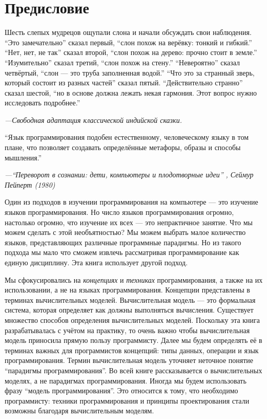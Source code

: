 \chapter*{Предисловие}

\epigraph{Шесть слепых мудрецов ощупали слона и начали обсуждать свои наблюдения. ``Это замечательно'' сказал первый, ``слон похож на верёвку: тонкий и гибкий.'' ``Нет, нет, не так'' сказал второй, ``слон похож на дерево: прочно стоит в земле.'' ``Изумительно'' сказал третий, ``слон похож на стену.'' ``Невероятно'' сказал четвёртый, ``слон --- это труба заполненная водой.'' ``Что это за странный зверь, который состоит из разных частей'' сказал пятый. ``Действительно странно'' сказал шестой, ``но в основе должна лежать некая гармония. Этот вопрос нужно исследовать подробнее.''}{\emph{---Свободная адаптация классической индийской сказки.}}


\epigraph{``Язык программирования подобен естественному, человеческому языку в том плане, что позволяет создавать определённые метафоры, образы и способы мышления.''}{\emph{---``Переворот в сознании: дети, компьютеры и плодотворные идеи'' \cite{141}, Сеймур Пейперт (1980)}}

Один из подходов в изучении программирования на компьютере --- это изучение языков программирования. Но число языков программирования огромно, настолько огромно, что изучение их всех --- это непрактичное занятие. Что мы можем сделать с этой необъятностью? Мы можем выбрать малое количество языков, представляющих различные программные парадигмы. Но из такого подхода мы мало что сможем извлечь рассматривая программирование как единую дисциплину. Эта книга использует другой подход.

Мы сфокусировались на \emph{концепциях} и \emph{техниках} программирования, а также на их использовании, а не на языках программирования. Концепции представлены в терминах вычислительных моделей. Вычислительная модель --- это формальная система, которая определяет как должны выполняться вычисления. Существует множество способов определения вычислительных моделей. Поскольку эта книга разрабатывалась с учётом на практику, то очень важно чтобы вычислительная модель приносила прямую пользу программисту. Далее мы будем определять её в терминах важных для программистов концепций: типы данных, операции и язык программирования. Термин вычислительная модель уточняет неточное понятие ``парадигмы программирования''. Во всей книге рассказывается о вычислительных моделях, а не парадигмах программирования. Иногда мы будем использовать фразу ``модель программирования''. Это относится к тому, что необходимо программисту: техники программирования и принципы проектирования стали возможны благодаря вычислительным моделям.

